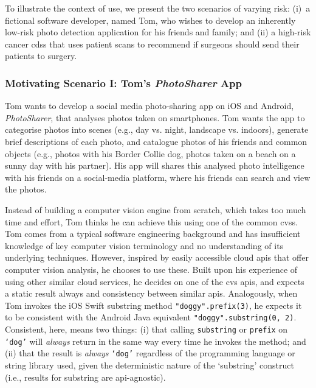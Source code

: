 To illustrate the context of use, we present the two scenarios of varying risk: (i)~a fictional software developer, named Tom, who wishes to develop an inherently low-risk photo detection application for his friends and family; and (ii) a high-risk cancer \gls{cdss} that uses patient scans to recommend if surgeons should send their patients to surgery.
  
\subsubsection{Motivating Scenario I: Tom's \textit{PhotoSharer} App}
\label{ssec:introduction:motivation:scenario:pam}

Tom wants to develop a social media photo-sharing app on iOS and Android, \textit{PhotoSharer}, that analyses photos taken on smartphones. Tom wants the app to categorise photos into scenes (e.g., day vs. night, landscape vs. indoors), generate brief descriptions of each photo, and catalogue photos of his friends and common objects (e.g., photos with his Border Collie dog, photos taken on a beach on a sunny day with his partner). His app will shares this analysed photo intelligence with his friends on a social-media platform, where his friends can search and view the photos.

Instead of building a computer vision engine from scratch, which takes too much time and effort, Tom thinks he can achieve this using one of the common \glspl{cvs}. Tom comes from a typical software engineering background and has insufficient knowledge of key computer vision terminology and no understanding of its underlying techniques. However, inspired by easily accessible cloud \glspl{api} that offer computer vision analysis, he chooses to use these. Built upon his experience of using other similar cloud services, he decides on one of the \gls{cvs} \glspl{api}, and expects a static result always and consistency between similar \glspl{api}. Analogously, when Tom invokes the iOS Swift substring method \texttt{"doggy".prefix(3)}, he expects it to be consistent with the Android Java equivalent \texttt{"doggy".substring(0, 2)}. Consistent, here, means two things: (i) that calling \texttt{substring} or \texttt{prefix} on \texttt{`dog'} will \textit{always} return in the same way every time he invokes the method; and (ii) that the result is \textit{always} \texttt{`dog'} regardless of the programming language or string library used, given the deterministic nature of the `substring' construct (i.e., results for substring are \gls{api}-agnostic). 

